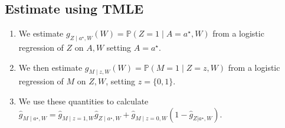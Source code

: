 \documentclass[
  12pt, krantz2,
]{book}
\providecommand{\tightlist}{%
  \setlength{\itemsep}{0pt}\setlength{\parskip}{0pt}}
\theoremstyle{definition}
\theoremstyle{definition}
\theoremstyle{definition}
\renewcommand{\P}{\mathbb{P}}
\newcommand{\1}{\mathbbm{1}}
\begin{document}
\hypertarget{estimate-using-tmle}{%
\subsection{Estimate using TMLE}\label{estimate-using-tmle}}

\begin{enumerate}
\def\labelenumi{\arabic{enumi}.}
\tightlist
\item
  We estimate \(g_{Z \mid a^{\star}, W}(W) = \P(Z=1 \mid A=a^{\star}, W)\) from
  a logistic regression of \(Z\) on \(A, W\) setting \(A=a^{\star}\).
\item
  We then estimate \(g_{M \mid z,W}(W) = \P(M=1 \mid Z=z, W)\) from a logistic
  regression of \(M\) on \(Z, W\), setting \(z=\{0,1\}\).
\item
  We use these quantities to calculate \(\hat{g}_{M \mid a^{\star}, W} = \hat{g}_{M \mid z=1,W}\hat{g}_{Z \mid a^{\star}, W} + \hat{g}_{M \mid z=0,W}(1-\hat{g}_{Z|a^{\star}, W})\).
\end{enumerate}
\end{document}
